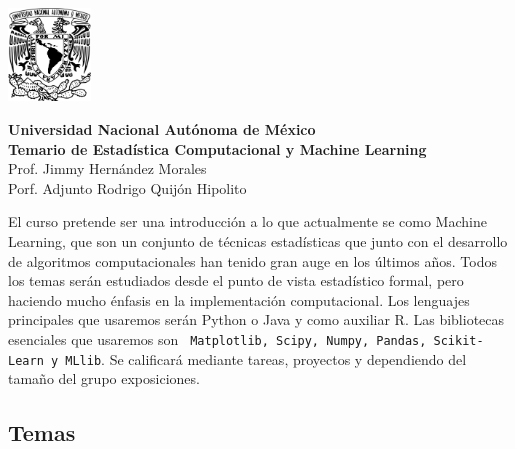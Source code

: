 \documentclass[11pt]{report}
\begin{document}
\pagestyle{fancy}

\begin{minipage}{3.8cm}
\includegraphics[width=2.2cm]{unam.pdf} 
\end{minipage}
\begin{minipage}{0.42\linewidth}
\begin{center}
{\large{\textbf{Universidad Nacional Autónoma de México}}\\\textbf{Temario de Estadística Computacional y Machine Learning}\\
Prof. Jimmy Hernández Morales\\
Porf. Adjunto  Rodrigo Quijón Hipolito}
\end{center}
\end{minipage}
\vspace{1cm}

\noindent El curso pretende ser una introducción a lo que actualmente se como Machine Learning, que son un conjunto de técnicas estadísticas que junto con el desarrollo de algoritmos computacionales han tenido gran auge en los últimos años.  Todos los temas serán estudiados desde el punto de vista estadístico formal, pero haciendo mucho énfasis en la implementación computacional. 
Los lenguajes principales que usaremos serán Python o Java y como auxiliar R. Las bibliotecas esenciales que usaremos son \texttt{ Matplotlib, Scipy, Numpy, Pandas, Scikit-Learn y MLlib}. Se calificará mediante tareas, proyectos y dependiendo del tamaño del grupo exposiciones.

\subsection*{Temas}
\end{document}

